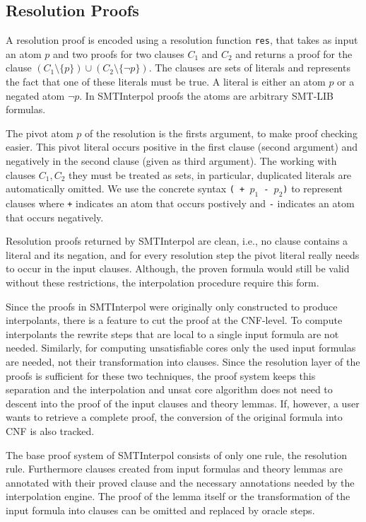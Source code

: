 \documentclass[a4paper]{article}
\newcommand\si{SMTInterpol\xspace}
\begin{document}
\subsection{Resolution Proofs}
\label{reslayer}

A resolution proof is encoded using a resolution function \verb+res+,
that takes as input an atom $p$ and two proofs for two clauses $C_1$
and $C_2$ and returns a proof for the clause $(C_1\setminus\{p\})
\cup (C_2 \setminus\{\lnot p\})$.  The clauses are sets of literals
and represents the fact that one of these literals must be true.  A
literal is either an atom $p$ or a negated atom $\lnot p$. In \si
proofs the atoms are arbitrary SMT-LIB formulas.

The pivot atom $p$ of the resolution is the firsts argument, to make
proof checking easier.  This pivot literal occurs positive in the
first clause (second argument) and negatively in the second clause
(given as third argument).  The working with clauses $C_1,C_2$ they
must be treated as sets, in particular, duplicated literals are
automatically omitted.  We use the concrete syntax \texttt{( + $p_1$ -
  $p_2$)} to represent clauses where \texttt{+} indicates an atom that
occurs postively and \texttt{-} indicates an atom that occurs
negatively.

Resolution proofs returned by \si are clean, i.e., no clause contains
a literal and its negation, and for every resolution step the pivot
literal really needs to occur in the input clauses.  Although, the
proven formula would still be valid without these restrictions, the
interpolation procedure require this form.

Since the proofs in \si were originally only constructed to produce
interpolants, there is a feature to cut the proof at the CNF-level.
To compute interpolants the rewrite steps that are local to a single
input formula are not needed.  Similarly, for computing unsatisfiable
cores only the used input formulas are needed, not their
transformation into clauses.  Since the resolution layer of the proofs
is sufficient for these two techniques, the proof system keeps this
separation and the interpolation and unsat core algorithm does not
need to descent into the proof of the input clauses and theory lemmas.
If, however, a user wants to retrieve a complete proof, the conversion
of the original formula into CNF is also tracked.

The base proof system of \si consists of only one rule, the resolution
rule.  Furthermore clauses created from input formulas and theory
lemmas are annotated with their proved clause and the necessary
annotations needed by the interpolation engine.  The proof of the lemma
itself or the transformation of the input formula into clauses can be
omitted and replaced by oracle steps.
\end{document}
